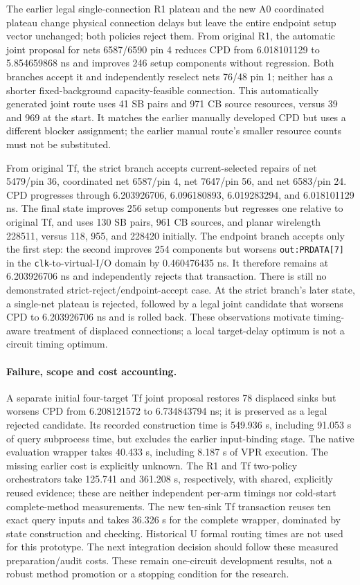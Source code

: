 The earlier legal single-connection R1 plateau and the new A0 coordinated plateau change physical connection delays but leave the entire endpoint setup vector unchanged; both policies reject them. From original R1, the automatic joint proposal for nets 6587/6590 pin 4 reduces CPD from 6.018101129 to 5.854659868 ns and improves 246 setup components without regression. Both branches accept it and independently reselect nets 76/48 pin 1; neither has a shorter fixed-background capacity-feasible connection. This automatically generated joint route uses 41 SB pairs and 971 CB source resources, versus 39 and 969 at the start. It matches the earlier manually developed CPD but uses a different blocker assignment; the earlier manual route's smaller resource counts must not be substituted.

From original Tf, the strict branch accepts current-selected repairs of net 5479/pin 36, coordinated net 6587/pin 4, net 7647/pin 56, and net 6583/pin 24. CPD progresses through 6.203926706, 6.096180893, 6.019283294, and 6.018101129 ns. The final state improves 256 setup components but regresses one relative to original Tf, and uses 130 SB pairs, 961 CB sources, and planar wirelength 228511, versus 118, 955, and 228420 initially. The endpoint branch accepts only the first step: the second improves 254 components but worsens \texttt{out:PRDATA[7]} in the \texttt{clk}-to-virtual-I/O domain by 0.460476435 ns. It therefore remains at 6.203926706 ns and independently rejects that transaction. There is still no demonstrated strict-reject/endpoint-accept case. At the strict branch's later state, a single-net plateau is rejected, followed by a legal joint candidate that worsens CPD to 6.203926706 ns and is rolled back. These observations motivate timing-aware treatment of displaced connections; a local target-delay optimum is not a circuit timing optimum.

\paragraph{Failure, scope and cost accounting.}
A separate initial four-target Tf joint proposal restores 78 displaced sinks but worsens CPD from 6.208121572 to 6.734843794 ns; it is preserved as a legal rejected candidate. Its recorded construction time is 549.936 s, including 91.053 s of query subprocess time, but excludes the earlier input-binding stage. The native evaluation wrapper takes 40.433 s, including 8.187 s of VPR execution. The missing earlier cost is explicitly unknown. The R1 and Tf two-policy orchestrators take 125.741 and 361.208 s, respectively, with shared, explicitly reused evidence; these are neither independent per-arm timings nor cold-start complete-method measurements. The new ten-sink Tf transaction reuses ten exact query inputs and takes 36.326 s for the complete wrapper, dominated by state construction and checking. Historical U formal routing times are not used for this prototype. The next integration decision should follow these measured preparation/audit costs. These remain one-circuit development results, not a robust method promotion or a stopping condition for the research.

